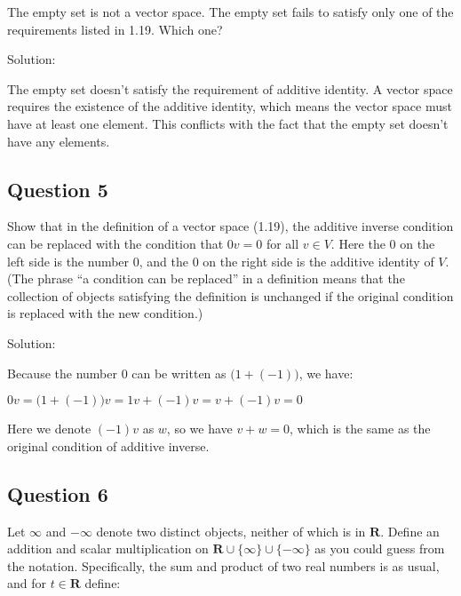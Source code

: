 \documentclass[12pt, letterpaper, oneside]{book}
\begin{document}
The empty set is not a vector space. The empty set fails to satisfy only one of
the requirements listed in 1.19. Which one?

Solution:

The empty set doesn't satisfy the requirement of additive identity. A vector
space requires the existence of the additive identity, which means the vector
space must have at least one element. This conflicts with the fact that the
empty set doesn't have any elements.

\subsection{Question 5}

Show that in the definition of a vector space (1.19), the additive inverse
condition can be replaced with the condition that $0v = 0$ for all $v \in V$.
Here the $0$ on the left side is the number 0, and the $0$ on the right side is
the additive identity of $V$. (The phrase ``a condition can be replaced'' in a
definition means that the collection of objects satisfying the definition is
unchanged if the original condition is replaced with the new condition.)

Solution:

Because the number $0$ can be written as $\bigl(1 + (-1)\bigr)$, we have:

$0v = \bigl(1 + (-1)\bigr)v = 1v + (-1)v = v + (-1)v = 0$

Here we denote $(-1)v$ as $w$, so we have $v + w = 0$, which is the same as the
original condition of additive inverse.

\subsection{Question 6}

Let $\infty$ and $-\infty$ denote two distinct objects, neither of which is in
$\mathbf{R}$. Define an addition and scalar multiplication on $\mathbf{R} \cup
  \{\infty\} \cup \{-\infty\}$ as you could guess from the notation. Specifically,
the sum and product of two real numbers is as usual, and for $t \in \mathbf{R}$
define:
\end{document}
